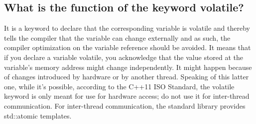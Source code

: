 \documentclass{report}
\begin{document}
\bigbreak \noindent 
\subsection{What is the function of the keyword volatile?}
\bigbreak \noindent 
It is a keyword to declare that the corresponding variable is
volatile and thereby tells the compiler that the variable can change
externally and as such, the compiler optimization on the variable
reference should be avoided.
\bigbreak \noindent 
It means that if you declare a variable volatile, you acknowledge
that the value stored at the variable’s memory address might
change independently.
\bigbreak \noindent 
It might happen because of changes introduced by hardware or by
another thread.
\bigbreak \noindent 
Speaking of this latter one, while it’s possible, according to the
C++11 ISO Standard, the volatile keyword is only meant for use
for hardware access; do not use it for inter-thread communication.
\bigbreak \noindent 
For inter-thread communication, the standard library provides
std::atomic templates.
\end{document}
